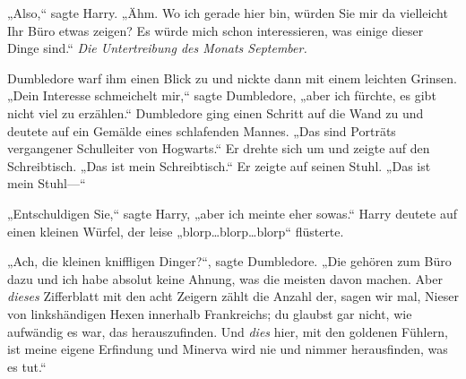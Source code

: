 „Also,“ sagte Harry. „Ähm. Wo ich gerade hier bin, würden Sie mir da vielleicht Ihr Büro etwas zeigen? Es würde mich schon interessieren, was einige dieser Dinge sind.“ \emph{Die Untertreibung des Monats September.}

Dumbledore warf ihm einen Blick zu und nickte dann mit einem leichten Grinsen. „Dein Interesse schmeichelt mir,“ sagte Dumbledore, „aber ich fürchte, es gibt nicht viel zu erzählen.“ Dumbledore ging einen Schritt auf die Wand zu und deutete auf ein Gemälde eines schlafenden Mannes. „Das sind Porträts vergangener Schulleiter von Hogwarts.“ Er drehte sich um und zeigte auf den Schreibtisch. „Das ist mein Schreibtisch.“ Er zeigte auf seinen Stuhl. „Das ist mein Stuhl—“

„Entschuldigen Sie,“ sagte Harry, „aber ich meinte eher sowas.“ Harry deutete auf einen kleinen Würfel, der leise „blorp…blorp…blorp“ flüsterte.

„Ach, die kleinen kniffligen Dinger?“, sagte Dumbledore. „Die gehören zum Büro dazu und ich habe absolut keine Ahnung, was die meisten davon machen. Aber \emph{dieses} Zifferblatt mit den acht Zeigern zählt die Anzahl der, sagen wir mal, Nieser von linkshändigen Hexen innerhalb Frankreichs; du glaubst gar nicht, wie aufwändig es war, das herauszufinden. Und \emph{dies} hier, mit den goldenen Fühlern, ist meine eigene Erfindung und Minerva wird nie und nimmer herausfinden, was es tut.“

